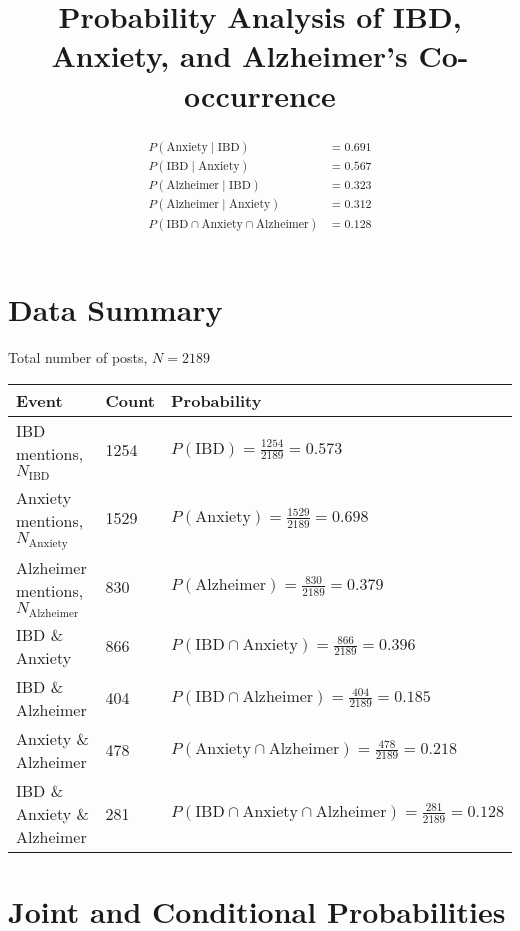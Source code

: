\documentclass[12pt]{article}
\title{Probability Analysis of IBD, Anxiety, and Alzheimer's Co-occurrence}
\author{}
\date{}
\begin{document}
\maketitle

\begin{abstract}
\begin{align*}
P(\text{Anxiety} \mid \text{IBD}) &= 0.691 \\
P(\text{IBD} \mid \text{Anxiety}) &= 0.567 \\
P(\text{Alzheimer} \mid \text{IBD}) &= 0.323 \\
P(\text{Alzheimer} \mid \text{Anxiety}) &= 0.312 \\
P(\text{IBD} \cap \text{Anxiety} \cap \text{Alzheimer}) &= 0.128
\end{align*}
\end{abstract}

\section*{Data Summary}

Total number of posts, $N = 2189$

\begin{center}
\begin{tabular}{@{}lll@{}}
\toprule
Event & Count & Probability \\ \midrule
IBD mentions, $N_{\text{IBD}}$ & 1254 & $P(\text{IBD}) = \frac{1254}{2189} = 0.573$ \\
Anxiety mentions, $N_{\text{Anxiety}}$ & 1529 & $P(\text{Anxiety}) = \frac{1529}{2189} = 0.698$ \\
Alzheimer mentions, $N_{\text{Alzheimer}}$ & 830 & $P(\text{Alzheimer}) = \frac{830}{2189} = 0.379$ \\
IBD \& Anxiety & 866 & $P(\text{IBD} \cap \text{Anxiety}) = \frac{866}{2189} = 0.396$ \\
IBD \& Alzheimer & 404 & $P(\text{IBD} \cap \text{Alzheimer}) = \frac{404}{2189} = 0.185$ \\
Anxiety \& Alzheimer & 478 & $P(\text{Anxiety} \cap \text{Alzheimer}) = \frac{478}{2189} = 0.218$ \\
IBD \& Anxiety \& Alzheimer & 281 & $P(\text{IBD} \cap \text{Anxiety} \cap \text{Alzheimer}) = \frac{281}{2189} = 0.128$ \\
\bottomrule
\end{tabular}
\end{center}

\section*{Joint and Conditional Probabilities}
\end{document}
